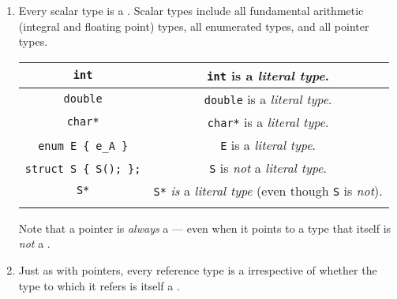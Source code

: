 \begin{enumerate}
\item{Every scalar type is a . Scalar types include all fundamental arithmetic (integral and floating point) types, all enumerated types, and all pointer types.

\begin{center}
{\small \begin{tabular}{c|c}\thickhline
\lstinline!int! &\lstinline!int! is a \emph{literal type}. \\ \hline
\lstinline!double! & \lstinline!double! is a \emph{literal type}. \\ \hline
\lstinline!char*! & \lstinline!char*! is a \emph{literal type}. \\ \hline
\lstinline!enum!~\lstinline!E!~\lstinline!{!~\lstinline!e_A!~\lstinline!}! & \lstinline!E! is a \emph{literal type}. \\ \hline
\lstinline!struct!~\lstinline!S!~\lstinline!{!~\lstinline!S();!~\lstinline!};!
& \lstinline!S! is \emph{not} a \emph{literal type}. \\ \hline
\lstinline!S*! & \lstinline!S*! \emph{is} a \emph{literal type} (even
though \lstinline!S! is \emph{not}).\\ \thickhline
\end{tabular}
}
\end{center}


Note that a pointer is \emph{always} a  --- even
when it points to a type that itself is \emph{not} a .}

\item{Just as with pointers, every reference type is a  irrespective of whether the type to which it refers is itself a .

}
\end{enumerate}
